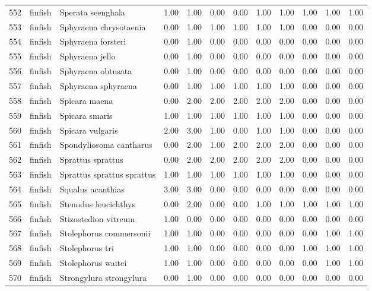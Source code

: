 \begin{table}[ht]
\begin{tabular}{rllrrrrrrrrr}
  552 & finfish & Sperata seenghala & 1.00 & 1.00 & 0.00 & 0.00 & 1.00 & 1.00 & 1.00 & 1.00 & 1.00 \\ 
  553 & finfish & Sphyraena chrysotaenia & 0.00 & 1.00 & 1.00 & 1.00 & 1.00 & 1.00 & 0.00 & 0.00 & 0.00 \\ 
  554 & finfish & Sphyraena forsteri & 0.00 & 1.00 & 0.00 & 0.00 & 0.00 & 0.00 & 0.00 & 0.00 & 0.00 \\ 
  555 & finfish & Sphyraena jello & 0.00 & 1.00 & 0.00 & 0.00 & 0.00 & 0.00 & 0.00 & 0.00 & 0.00 \\ 
  556 & finfish & Sphyraena obtusata & 0.00 & 1.00 & 0.00 & 0.00 & 0.00 & 0.00 & 0.00 & 0.00 & 0.00 \\ 
  557 & finfish & Sphyraena sphyraena & 0.00 & 1.00 & 1.00 & 1.00 & 1.00 & 1.00 & 0.00 & 0.00 & 0.00 \\ 
  558 & finfish & Spicara maena & 0.00 & 2.00 & 2.00 & 2.00 & 2.00 & 2.00 & 0.00 & 0.00 & 0.00 \\ 
  559 & finfish & Spicara smaris & 1.00 & 1.00 & 1.00 & 1.00 & 1.00 & 1.00 & 0.00 & 0.00 & 0.00 \\ 
  560 & finfish & Spicara vulgaris & 2.00 & 3.00 & 1.00 & 0.00 & 1.00 & 1.00 & 0.00 & 0.00 & 0.00 \\ 
  561 & finfish & Spondyliosoma cantharus & 0.00 & 2.00 & 1.00 & 2.00 & 2.00 & 2.00 & 0.00 & 0.00 & 0.00 \\ 
  562 & finfish & Sprattus sprattus & 0.00 & 2.00 & 2.00 & 2.00 & 2.00 & 2.00 & 0.00 & 0.00 & 0.00 \\ 
  563 & finfish & Sprattus sprattus sprattus & 1.00 & 1.00 & 1.00 & 1.00 & 1.00 & 1.00 & 0.00 & 0.00 & 0.00 \\ 
  564 & finfish & Squalus acanthias & 3.00 & 3.00 & 0.00 & 0.00 & 0.00 & 0.00 & 0.00 & 0.00 & 0.00 \\ 
  565 & finfish & Stenodus leucichthys & 0.00 & 2.00 & 0.00 & 0.00 & 1.00 & 1.00 & 1.00 & 1.00 & 1.00 \\ 
  566 & finfish & Stizostedion vitreum & 1.00 & 0.00 & 0.00 & 0.00 & 0.00 & 0.00 & 0.00 & 0.00 & 0.00 \\ 
  567 & finfish & Stolephorus commersonii & 1.00 & 1.00 & 0.00 & 0.00 & 0.00 & 0.00 & 0.00 & 1.00 & 1.00 \\ 
  568 & finfish & Stolephorus tri & 1.00 & 1.00 & 0.00 & 0.00 & 0.00 & 0.00 & 1.00 & 1.00 & 1.00 \\ 
  569 & finfish & Stolephorus waitei & 1.00 & 1.00 & 0.00 & 0.00 & 0.00 & 0.00 & 0.00 & 1.00 & 1.00 \\ 
  570 & finfish & Strongylura strongylura & 0.00 & 1.00 & 0.00 & 0.00 & 0.00 & 0.00 & 0.00 & 0.00 & 0.00 \\ 

\end{tabular}
\end{table}

